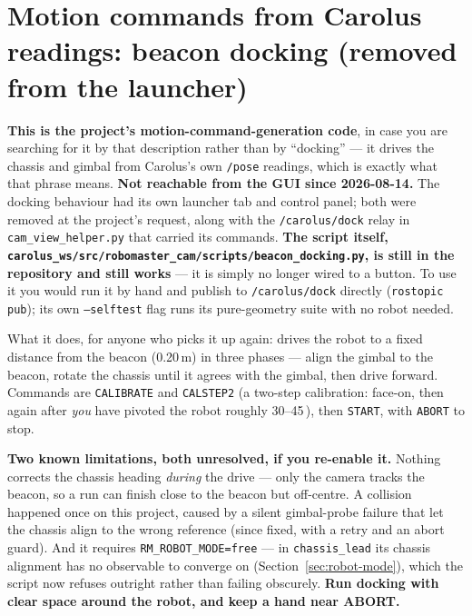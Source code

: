 \documentclass[11pt]{report}
\newenvironment{warningbox}%
  {\begin{lrbox}{\warnbox}\begin{minipage}{0.90\textwidth}}%
  {\end{minipage}\end{lrbox}%
   \begin{center}\fcolorbox{black}{codebg}{\usebox{\warnbox}}\end{center}}
\begin{document}
\section{Motion commands from Carolus readings: beacon docking (removed from the launcher)}
\label{sec:docking}

\textbf{This is the project's motion-command-generation code}, in case you
are searching for it by that description rather than by ``docking'' ---
it drives the chassis and gimbal from Carolus's own \texttt{/pose} readings,
which is exactly what that phrase means. \textbf{Not reachable from the GUI
since 2026-08-14.} The docking behaviour
had its own launcher tab and control panel; both were removed at the
project's request, along with the \texttt{/carolus/dock} relay in
\texttt{cam\_view\_helper.py} that carried its commands. \textbf{The script
itself, \texttt{carolus\_ws/src/robomaster\_cam/scripts/beacon\_docking.py},
is still in the repository and still works} --- it is simply no longer
wired to a button. To use it you would run it by hand and publish to
\texttt{/carolus/dock} directly (\texttt{rostopic pub}); its own
\texttt{--selftest} flag runs its pure-geometry suite with no robot needed.

What it does, for anyone who picks it up again: drives the robot to a fixed
distance from the beacon (0.20\,m) in three phases --- align the gimbal to
the beacon, rotate the chassis until it agrees with the gimbal, then drive
forward. Commands are \texttt{CALIBRATE} and \texttt{CALSTEP2} (a two-step
calibration: face-on, then again after \emph{you} have pivoted the robot
roughly 30--45\,\textdegree{}), then \texttt{START}, with \texttt{ABORT} to
stop.

\begin{warningbox}
\textbf{Two known limitations, both unresolved, if you re-enable it.}
Nothing corrects the chassis heading \emph{during} the drive --- only the
camera tracks the beacon, so a run can finish close to the beacon but
off-centre. A collision happened once on this project, caused by a silent
gimbal-probe failure that let the chassis align to the wrong reference
(since fixed, with a retry and an abort guard). And it requires
\texttt{RM\_ROBOT\_MODE=free} --- in \texttt{chassis\_lead} its chassis
alignment has no observable to converge on (Section~\ref{sec:robot-mode}),
which the script now refuses outright rather than failing obscurely.
\textbf{Run docking with clear space around the robot, and keep a hand near
ABORT.}
\end{warningbox}
\end{document}

